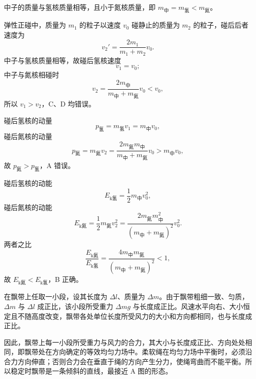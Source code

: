 \begin{answer}
中子的质量与氢核质量相等，且小于氮核质量，即 $m_{\text{中}}=m_{\text{氢}}<m_{\text{氮}}$。

弹性正碰中，质量为 $m_{1}$ 的粒子以速度 $v_{0}$ 碰静止的质量为 $m_{2}$ 的粒子，碰后后者速度为
\[
  v_{2}'=\frac{2m_{1}}{m_{1}+m_{2}}v_{0}.
\]
中子与氢核质量相等，故碰后氢核速度
\[
  v_{1}=v_{0};
\]
中子与氮核相碰时
\[
  v_{2}=\frac{2m_{\text{中}}}{m_{\text{中}}+m_{\text{氮}}}v_{0}<v_{0},
\]
所以 $v_{1}>v_{2}$，C、D 均错误。

碰后氢核的动量
\[
  p_{\text{氢}}=m_{\text{氢}}v_{1}=m_{\text{中}}v_{0},
\]
碰后氮核的动量
\[
  p_{\text{氮}}=m_{\text{氮}}v_{2}=\frac{2m_{\text{氮}}m_{\text{中}}}{m_{\text{中}}+m_{\text{氮}}}v_{0}>m_{\text{中}}v_{0},
\]
故 $p_{\text{氮}}>p_{\text{氢}}$，A 错误。

碰后氢核的动能
\[
  E_{\text{k氢}}=\frac{1}{2}m_{\text{中}}v_{0}^{2},
\]
碰后氮核的动能
\[
  E_{\text{k氮}}=\frac{1}{2}m_{\text{氮}}v_{2}^{2}
  =\frac{2m_{\text{氮}}m_{\text{中}}^{2}}{(m_{\text{中}}+m_{\text{氮}})^{2}}v_{0}^{2}.
\]
两者之比
\[
  \frac{E_{\text{k氮}}}{E_{\text{k氢}}}
  =\frac{4m_{\text{中}}m_{\text{氮}}}{(m_{\text{中}}+m_{\text{氮}})^{2}}<1,
\]
故 $E_{\text{k氮}}<E_{\text{k氢}}$，B 正确。
\end{answer}

\begin{answer}
在飘带上任取一小段，设其长度为 $\Delta l$、质量为 $\Delta m$。由于飘带粗细一致、匀质，$\Delta m$ 与 $\Delta l$ 成正比，该小段所受重力 $\Delta m g$ 与长度成正比。风速水平向右、大小恒定且不随高度改变，飘带各处单位长度所受风力的大小和方向都相同，也与长度成正比。

因此，飘带上每一小段所受重力与风力的合力，其大小与长度成正比、方向处处相同，即飘带处在方向确定的等效均匀力场中。柔软绳在均匀力场中平衡时，必须沿合力方向伸直；否则合力会在垂直于绳的方向产生分力，使绳弯曲而不能平衡。所以稳定时飘带是一条倾斜的直线，最接近 A 图的形态。
\end{answer}

